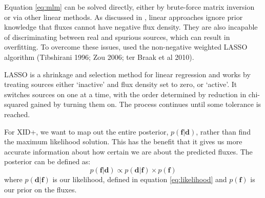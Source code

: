 \documentclass[useAMS,usenatbib]{mn2e}
\begin{document}
Equation \ref{eq:mlm} can be solved directly, either by brute-force matrix inversion or via other linear methods. As discussed in \cite{Roseboom:2010, Roseboom:2011, Wang:2014}, linear approaches ignore prior knowledge that fluxes cannot have negative flux density.%
They are also incapable of discriminating between real and spurious sources, which can result in overfitting. To overcome these issues, \cite{Roseboom:2011} used the non-negative weighted LASSO algorithm (Tibshirani 1996; Zou 2006; ter Braak et al 2010).

LASSO is a shrinkage and selection method for linear regression and works by treating sources either `inactive' and flux density set to zero, or `active'. It switches sources on one at a time, with the order determined by reduction in chi-squared gained by turning them on. The process continues until some tolerance is reached.

%

For XID+, we want to map out the entire posterior, $p(\mathbf{f}|\mathbf{d})$, rather than find the maximum likelihood solution. This has the benefit that it gives us more accurate information about how certain we are about the predicted fluxes. The posterior can be defined as:
\begin{equation}
p(\mathbf{f}|\mathbf{d}) \propto p(\mathbf{d}|\mathbf{f}) \times p(\mathbf{f})
\end{equation}
where $p(\mathbf{d}|\mathbf{f})$ is our likelihood, defined in equation \ref{eq:likelihood} and $p(\mathbf{f})$ is our prior on the fluxes. 
\end{document}
